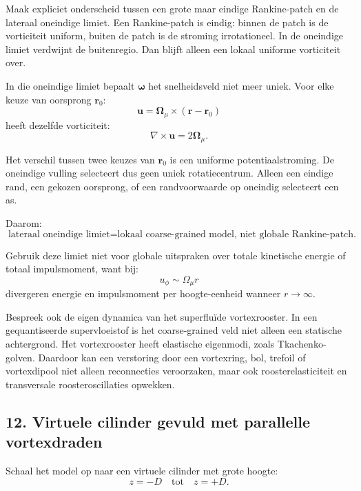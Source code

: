 \documentclass[11pt]{article}
\begin{document}
        Maak expliciet onderscheid tussen een grote maar eindige Rankine-patch en de lateraal oneindige limiet. Een Rankine-patch is eindig: binnen de patch is de vorticiteit uniform, buiten de patch is de stroming irrotationeel. In de oneindige limiet verdwijnt de buitenregio. Dan blijft alleen een lokaal uniforme vorticiteit over.
        
        In die oneindige limiet bepaalt \(\boldsymbol{\omega}\) het snelheidsveld niet meer uniek. Voor elke keuze van oorsprong \(\mathbf{r}_0\):
        \[
            \mathbf{u}
            =
            \boldsymbol{\Omega}_{\mu}
            \times
            (\mathbf{r}-\mathbf{r}_0)
        \]
        heeft dezelfde vorticiteit:
        \[
            \nabla\times\mathbf{u}
            =
            2\boldsymbol{\Omega}_{\mu}.
        \]
        
        Het verschil tussen twee keuzes van \(\mathbf{r}_0\) is een uniforme potentiaalstroming. De oneindige vulling selecteert dus geen uniek rotatiecentrum. Alleen een eindige rand, een gekozen oorsprong, of een randvoorwaarde op oneindig selecteert een as.
        
        Daarom:
        \[
            \boxed{
                \text{lateraal oneindige limiet}
                =
                \text{lokaal coarse-grained model, niet globale Rankine-patch.}
            }
        \]
        
        Gebruik deze limiet niet voor globale uitspraken over totale kinetische energie of totaal impulsmoment, want bij:
        \[
            u_{\phi}\sim\Omega_{\mu}r
        \]
        divergeren energie en impulsmoment per hoogte-eenheid wanneer \(r\rightarrow\infty\).
        
        Bespreek ook de eigen dynamica van het superfluïde vortexrooster. In een gequantiseerde supervloeistof is het coarse-grained veld niet alleen een statische achtergrond. Het vortexrooster heeft elastische eigenmodi, zoals Tkachenko-golven. Daardoor kan een verstoring door een vortexring, bol, trefoil of vortexdipool niet alleen reconnecties veroorzaken, maar ook roosterelasticiteit en transversale roosteroscillaties opwekken.
    
    \subsection{12. Virtuele cilinder gevuld met parallelle vortexdraden}
        
        Schaal het model op naar een virtuele cilinder met grote hoogte:
        \[
            z=-D
            \quad\text{tot}\quad
            z=+D.
        \]
        
\end{document}
